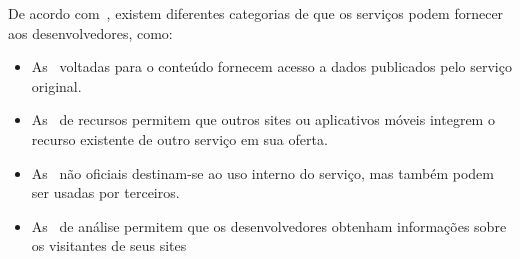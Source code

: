 De acordo com~\textcite{russel2019}, existem diferentes categorias de
 que os serviços podem fornecer aos desenvolvedores, como:

\begin{itemize}
    \item As~ voltadas para o conteúdo fornecem acesso a
    dados publicados pelo serviço original.
    \item As~ de recursos permitem que outros sites ou
    aplicativos móveis integrem o recurso existente de outro serviço em sua
    oferta.
    \item As~ não oficiais destinam-se ao uso interno do
    serviço, mas também podem ser usadas por terceiros.
    \item As~ de análise permitem que os desenvolvedores
    obtenham informações sobre os visitantes de seus sites
\end{itemize}
